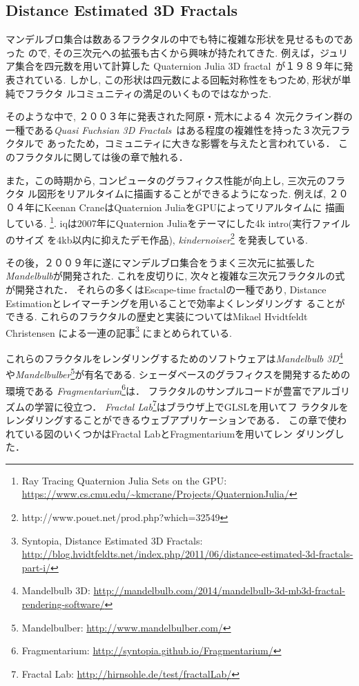 \subsection{Distance Estimated 3D Fractals}

マンデルブロ集合は数あるフラクタルの中でも特に複雑な形状を見せるものであった
ので, その三次元への拡張も古くから興味が持たれてきた.
例えば，ジュリア集合を四元数を用いて計算した
Quaternion Julia 3D fractal~\cite{hart1989ray}が１９８９年に発表されている.
しかし, この形状は四元数による回転対称性をもつため, 形状が単純でフラクタ
ルコミュニティの満足のいくものではなかった.

そのような中で, ２００３年に発表された阿原・荒木による４
次元クライン群の一種である{\it Quasi Fuchsian 3D
Fractals}~\cite{ahara2003sphairahedral}はある程度の複雑性を持った３次元フラクタルで
あったため，コミュニティに大きな影響を与えたと言われている．
このフラクタルに関しては後の章で触れる．

また，この時期から, コンピュータのグラフィクス性能が向上し, 三次元のフラクタ
ル図形をリアルタイムに描画することができるようになった.
例えば, ２００４年にKeenan CraneはQuaternion JuliaをGPUによってリアルタイムに
描画している. \footnote{Ray Tracing Quaternion Julia Sets on
the GPU:
\url{https://www.cs.cmu.edu/~kmcrane/Projects/QuaternionJulia/}}.
iqは2007年にQuaternion Juliaをテーマにした4k intro(実行ファイルのサイズ
を4kb以内に抑えたデモ作品),
\textit{kindernoiser}\footnote{http://www.pouet.net/prod.php?which=32549}
を発表している.

その後，２００９年に遂にマンデルブロ集合をうまく三次元に拡張した{\it
Mandelbulb}が開発された.
これを皮切りに, 次々と複雑な三次元フラクタルの式が開発された．
それらの多くはEscape-time fractalの一種であり,
Distance Estimationとレイマーチングを用いることで効率よくレンダリングす
ることができる.
これらのフラクタルの歴史と実装についてはMikael Hvidtfeldt Christensen
による一連の記事\footnote{Syntopia, Distance Estimated 3D
Fractals:\\ \quad \quad
\url{http://blog.hvidtfeldts.net/index.php/2011/06/distance-estimated-3d-fractals-part-i/}}
にまとめられている.

これらのフラクタルをレンダリングするためのソフトウェアは{\it Mandelbulb
3D}\footnote{Mandelbulb 3D:
\url{http://mandelbulb.com/2014/mandelbulb-3d-mb3d-fractal-rendering-software/}}
や{\it Mandelbulber}\footnote{Mandelbulber:
\url{http://www.mandelbulber.com/}}が有名である.
シェーダベースのグラフィクスを開発するための環境である
{\it Fragmentarium}\footnote{Fragmentarium:
\url{http://syntopia.github.io/Fragmentarium/}}は．
フラクタルのサンプルコードが豊富でアルゴリズムの学習に役立つ．
{\it Fractal Lab}\footnote{Fractal Lab:
\url{http://hirnsohle.de/test/fractalLab/}}はブラウザ上でGLSLを用いてフ
ラクタルをレンダリングすることができるウェブアプリケーションである．
この章で使われている図のいくつかはFractal LabとFragmentariumを用いてレン
ダリングした．

